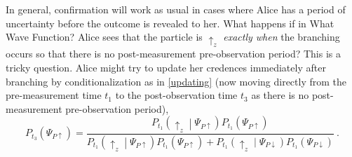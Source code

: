 \documentclass[onecolumn,secnumarabic,amsmath,amssymb,balancelastpage,nofootinbib]{article}
\begin{document}
In general, confirmation will work as usual in cases where Alice has a period of uncertainty before the outcome is revealed to her.  What happens if in {\sc What Wave Function?} Alice sees that the particle is $\uparrow_z$ \emph{exactly when} the branching occurs so that there is no post-measurement pre-observation period?  This is a tricky question.  Alice might try to update her credences immediately after branching by conditionalization as in \eqref{updating} (now moving directly from the pre-measurement time $t_1$ to the post-observation time $t_3$ as there is no post-measurement pre-observation period),
\begin{equation}
P_{t_3}\left(\Psi_{P\uparrow}\right)=\frac{P_{t_1}\left(\uparrow_z\middle|\Psi_{P\uparrow}\right)P_{t_1}\left(\Psi_{P\uparrow}\right)}{P_{t_1}\left(\uparrow_z\middle|\Psi_{P\uparrow}\right)P_{t_1}\left(\Psi_{P\uparrow}\right)+P_{t_1}\left(\uparrow_z\middle|\Psi_{P\downarrow}\right)P_{t_1}\left(\Psi_{P\downarrow}\right)}\ .
\label{}
\end{equation}
\end{document}
